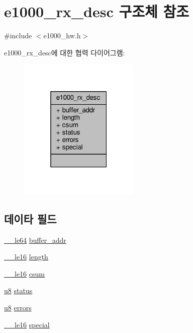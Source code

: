 \hypertarget{structe1000__rx__desc}{}\section{e1000\+\_\+rx\+\_\+desc 구조체 참조}
\label{structe1000__rx__desc}


{\ttfamily \#include $<$e1000\+\_\+hw.\+h$>$}



e1000\+\_\+rx\+\_\+desc에 대한 협력 다이어그램\+:
\nopagebreak
\begin{figure}[H]
\begin{center}
\leavevmode
\includegraphics[width=163pt]{structe1000__rx__desc__coll__graph}
\end{center}
\end{figure}
\subsection*{데이타 필드}
\begin{DoxyCompactItemize}
\item 
\hyperlink{lib_2igb_2e1000__osdep_8h_a082a2c540152aca8c135a709aa7d228f}{\+\_\+\+\_\+le64} \hyperlink{structe1000__rx__desc_a87d79130b57fb21eedf04b9d3945c3d6}{buffer\+\_\+addr}
\item 
\hyperlink{lib_2igb_2e1000__osdep_8h_a42b303dec823d42e18116e091891a235}{\+\_\+\+\_\+le16} \hyperlink{structe1000__rx__desc_adb05ebb496f195c1ce4e49f46fb420f0}{length}
\item 
\hyperlink{lib_2igb_2e1000__osdep_8h_a42b303dec823d42e18116e091891a235}{\+\_\+\+\_\+le16} \hyperlink{structe1000__rx__desc_ab0c14ac455d34425586c90498f0bd29f}{csum}
\item 
\hyperlink{lib_2igb_2e1000__osdep_8h_a8baca7e76da9e0e11ce3a275dd19130c}{u8} \hyperlink{structe1000__rx__desc_aa648386576736be0dd25c95b6edd37d2}{status}
\item 
\hyperlink{lib_2igb_2e1000__osdep_8h_a8baca7e76da9e0e11ce3a275dd19130c}{u8} \hyperlink{structe1000__rx__desc_a766b3bc0bb9fb679f53b877ef8509a4c}{errors}
\item 
\hyperlink{lib_2igb_2e1000__osdep_8h_a42b303dec823d42e18116e091891a235}{\+\_\+\+\_\+le16} \hyperlink{structe1000__rx__desc_a583ef448358a17812f8e8febe5da37a3}{special}
\end{DoxyCompactItemize}


